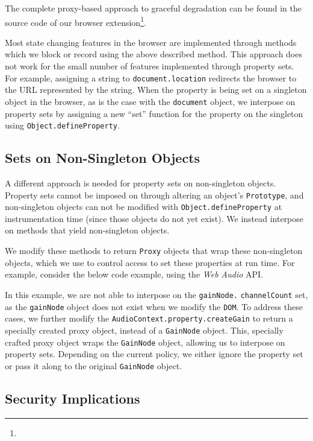 The complete proxy-based approach to graceful degradation can be found in
the source code of our browser extension\footnote{\ExtensionSourceUrl}.

Most state changing features in the browser are implemented through methods
which we block or record using the above described method.  This approach
does not work for the small number of features implemented through property sets.
For example, assigning a string to \texttt{document.location} redirects
the browser to the URL represented by the string.  When the property is
being set on a singleton object in the browser, as is the case with the
\texttt{document} object, we interpose on property sets by assigning a new
``set'' function for the property on the singleton using
\texttt{Object.defineProperty}.

\subsection{Sets on Non-Singleton Objects}
\label{cost-benefit:intercepting-js:proxy-non-signletons}
A different approach is needed for property sets on non-singleton objects.
Property sets cannot be imposed on through
altering an object's \texttt{Prototype}, and non-singleton objects
can not be modified with \texttt{Object.defineProperty} at
instrumentation time (since those objects do not yet exist). We instead interpose
on methods that yield non-singleton objects.

We modify these methods to return
\texttt{Proxy} objects that wrap these non-singleton objects, which we use
to control access to set these properties at run time. For example,
consider the below code example, using the \emph{Web Audio} API.



In this example, we are not able to interpose on the \texttt{gainNode.} \texttt{channelCount}
set, as the \texttt{gainNode} object does not exist when we modify the
\texttt{DOM}.  To address these cases, we further modify the
\texttt{AudioContext.property.createGain} to return a specially created
proxy object, instead of a \texttt{GainNode} object.  This, specially crafted
proxy object wraps the \texttt{GainNode} object, allowing us to interpose
on property sets.  Depending on the current policy, we either ignore the
property set or pass it along to the original \texttt{GainNode} object.


\subsection{Security Implications}
\label{cost-benefit:intercepting-js:proxy-security}

